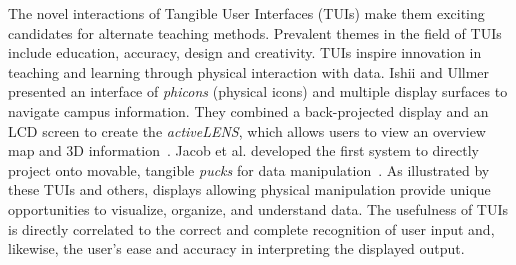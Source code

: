 \documentclass{article}
\begin{document}
The novel interactions of Tangible User Interfaces (TUIs) make them
exciting candidates for alternate teaching methods. 
Prevalent themes
in the field of TUIs include education, accuracy, design and creativity.
%
%
TUIs inspire innovation in teaching and learning through physical
interaction with data.  Ishii and Ullmer presented an interface of
{\em phicons} (physical icons) and multiple display surfaces to
navigate campus information.  They combined a back-projected display
and an LCD screen to create the {\em activeLENS}, which allows users
to view an overview map and 3D information~\cite{Ishii97tangiblebits}.
%
%
%
Jacob et al. developed the first system to directly project onto
movable, tangible {\em pucks} for data manipulation~\cite{Jacob01atangible}.
%
%
%
As illustrated by these TUIs and others, displays allowing physical
manipulation provide unique opportunities to visualize, organize,
and understand data.
%
%
The usefulness of TUIs is directly correlated to the correct and
complete recognition of user input and, likewise, the user's ease and
accuracy in interpreting the displayed output. 
%
\end{document}
